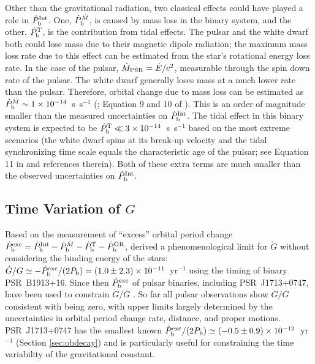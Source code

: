 Other than the gravitational radiation, two classical effects could have played a role in
$\dot{P}_{\rm b}^{\rm Int}$. One, $\dot{P}_{\rm b}^{\dot{M}}$, is caused by mass loss in the
binary system, and the other, $\dot{P}_{\rm b}^{\rm T}$, is the contribution
from tidal effects.
The pulsar and the white dwarf both could lose mass due to their magnetic dipole radiation; the maximum
mass loss rate due to this effect can be estimated from the
star's rotational energy loss rate. In the case of the pulsar, $\dot{M}_{\rm
PSR}=\dot{E}/c^2$, measurable through the spin down rate of the pulsar.
The white dwarf generally loses mass at a much lower rate than the pulsar.
Therefore, orbital change due to mass loss can be estimated as $\dot{P}_{\rm
b}^{\dot{M}}\sim 1\times10^{-14}$~s~s$^{-1}$ (\citealt{dt91}; Equation 9 and 10
of \citealt{fwe+12}). This is an order of magnitude smaller than the measured
uncertainties on $\dot{P}_{\rm b}^{\rm Int}$.
The tidal effect in this binary system is expected to be $\dot{P}_{\rm b}^{\rm
T}\ll3\times10^{-14}$~s~s$^{-1}$ based on the most extreme scenarios (the white
dwarf spins at its break-up velocity and the tidal synchronizing time scale equals the
characteristic age of the pulsar; see Equation 11 in \citealt{fwe+12} and
references therein).
Both of these extra terms are much smaller than the observed uncertainties
on $\dot{P}_{\rm b}^{\rm Int}$.


\subsection{Time Variation of $G$}
\label{sec:Gdot}


Based on the measurement of ``excess'' orbital period change 
$\dot{P}_{\rm b}^{\rm exc}=\dot{P}_{\rm b}^{\rm Int} - \dot{P}_{\rm
b}^{\dot{M}}  - \dot{P}_{\rm b}^{\rm T} - \dot{P}_{\rm b}^{\rm GR}$,
\citet{dgt88} derived a phenomenological limit for $\dot{G}$ without considering the binding energy of the stars: 
$\dot{G}/G\simeq-\dot{P}_{\rm b}^{\rm exc}/(2P_{\rm
b})=(1.0\pm2.3)\times10^{-11}$~yr$^{-1}$ using the timing of binary PSR~B1913+16. 
Since then $\dot{P}_{\rm b}^{\rm exc}$ of pulsar binaries, including 
PSR~J1713+0747, have been used to 
constrain $\dot{G}/G$ \citep{ktr94, nss+05, dvtb08, lwj+09, fwe+12}. 
So far all pulsar observations show $\dot{G}/G$ consistent with being zero, with 
upper limits largely determined by the uncertainties in orbital period change rate, distance, 
and proper motions.
PSR~J1713+0747 has the smallest known $\dot{P}_{\rm b}^{\rm exc}/(2P_{\rm
b})\simeq(-0.5\pm0.9)\times10^{-12}$~yr$^{-1}$ (Section \ref{sec:obdecay}) and is
particularly useful for constraining the time variability of the gravitational
constant.

